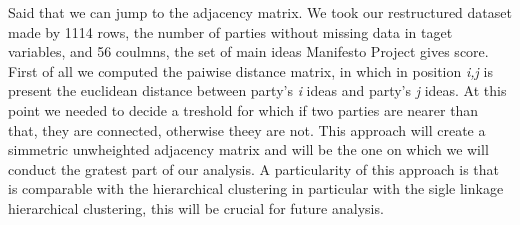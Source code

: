 \documentclass{article}%
\begin{document}
Said that we can jump to the adjacency matrix. We took our restructured dataset made by 1114 rows, the number of parties without missing data in taget variables, and 56 coulmns, the set of main ideas Manifesto Project gives score. First of all we computed the paiwise distance matrix, in which in position \emph{i,j} is present the euclidean distance between party's \emph{i} ideas and party's \emph{j} ideas. 
At this point we needed to decide a treshold for which if two parties are nearer than that, they are connected, otherwise theey are not. This approach will create a simmetric unwheighted adjacency matrix and will be the one on which we will conduct the gratest part of our analysis.
A particularity of this approach is that is comparable with the hierarchical clustering in particular with the sigle linkage hierarchical clustering, this will be crucial for future analysis.
\end{document}
